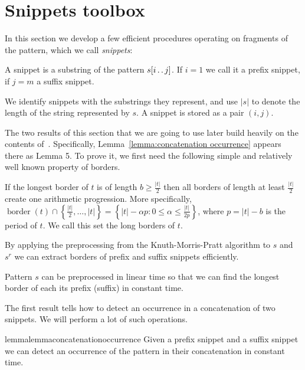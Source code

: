 \documentclass[runningheads]{llncs}
\DeclareMathOperator{\bord}{border}
\newcommand{\twodots}{\mathinner{\ldotp\ldotp}}
\begin{document}
\section{Snippets toolbox}

In this section we develop a few efficient procedures operating on fragments of the pattern, which we call {\it snippets}:

\begin{definition}
A snippet is a substring of the pattern $s[i\twodots j]$. If $i=1$ we call it a prefix snippet, if $j=m$ a suffix snippet.
\end{definition}

We identify snippets with the substrings they represent, and use $|s|$ to denote the length of the string represented by $s$. A snippet is stored as a pair $(i,j)$.

The two results of this section that we are going to use later build heavily on the contents of~\cite{GawrychowskiLZW}. Specifically, Lemma~\ref{lemma:concatenation occurrence} appears there as Lemma 5. To prove it, we first need the following simple and relatively well known property of borders.

\begin{lemma}\label{lemma:few borders}
If the longest border of $t$ is of length $b\geq\frac{|t|}{2}$ then all borders of length at least $\frac{|t|}{2}$ create one arithmetic progression. More specifically, $\bord(t)\cap\left\{\frac{|t|}{2},\ldots,|t|\right\}=\left\{|t|-\alpha p: 0\leq\alpha\leq\frac{|t|}{2p} \right\}$, where $p=|t|-b$ is the period of $t$. We call this set the long borders of $t$.
\end{lemma}

By applying the preprocessing from the Knuth-Morris-Pratt algorithm to $s$ and $s^r$ we can extract borders of prefix and suffix snippets efficiently.

\begin{lemma}\label{lemma:borders preprocessing}
Pattern $s$ can be preprocessed in linear time so that we can find the longest border of each its prefix (suffix) in constant time.
\end{lemma}



The first result tells how to detect an occurrence in a concatenation of two snippets. We will perform a lot of such operations.


\begin{restatable}{lemma}{lemmaconcatenationoccurrence}
\label{lemma:concatenation occurrence}
Given a prefix snippet and a suffix snippet we can detect an occurrence of the pattern in their concatenation in constant time.
\end{restatable}
\end{document}
